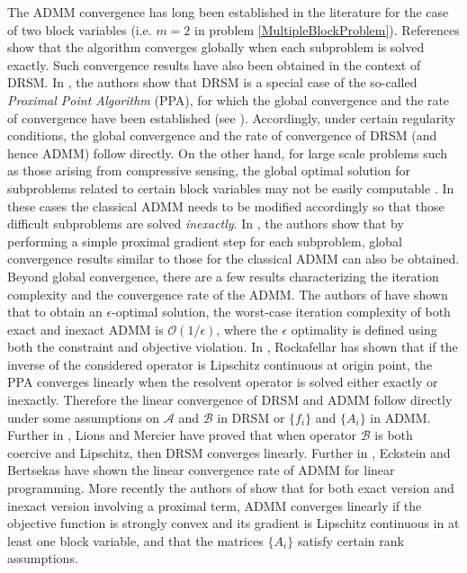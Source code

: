 \documentclass{mcom-l}
\theoremstyle{definition}
\theoremstyle{remark}
\numberwithin{equation}{section}
\begin{document}
The ADMM convergence has long been established in the literature for the case of two block variables (i.e. $m=2$ in problem \eqref{MultipleBlockProblem}). References \cite{GabayMercier1976,Glowinski1975} show that the algorithm converges globally when each subproblem is solved exactly. Such convergence results have also been obtained in the context of DRSM. In \cite{EcksteinBertsekas1992}, the authors show that DRSM is a special case of the so-called {\em{Proximal Point Algorithm}} (PPA), for which the global convergence and the rate of convergence have been established (see \cite{Rockafellar1976}). Accordingly, under certain regularity conditions, the global convergence and the rate of convergence of DRSM (and hence ADMM) follow directly. On the other hand, for large scale problems such as those arising from compressive sensing, the global optimal solution for subproblems related to certain block variables may not be easily computable \cite{YangZhang2011}.  In these cases the classical ADMM needs to be modified accordingly so that those difficult subproblems are solved {\it inexactly}. In \cite{Eckstein1994,EcksteinBertsekas1992,HeLiaoHanYang2002,WangYuan2012,YangZhang2011,ZhangBurgerOsher2011}, the authors show that by performing a simple proximal gradient step for each subproblem, global convergence results similar to those for the classical ADMM can also be obtained. Beyond global convergence, there are a few results characterizing the iteration complexity and the convergence rate of the ADMM. The authors of \cite{HeYuan2012} have shown that to obtain an $\epsilon$-optimal solution, the worst-case iteration complexity of both exact and inexact ADMM is $\mathcal{O}(1/\epsilon)$, where the $\epsilon$ optimality is defined using both the constraint and objective violation. In \cite{Rockafellar1976}, Rockafellar has shown that if the inverse of the considered operator is Lipschitz continuous at origin point, the PPA converges linearly when the resolvent operator is solved either exactly or inexactly. Therefore the linear convergence of DRSM and ADMM follow directly under some assumptions on $\mathcal{A}$ and $\mathcal{B}$ in DRSM or $\{f_i\}$ and $\{A_i\}$ in ADMM. Further in \cite{LionsMercier1979}, Lions and Mercier have proved that when operator $\mathcal{B}$ is both coercive and Lipschitz, then DRSM converges linearly. Further in \cite{EcksteinBertsekas1990}, Eckstein and Bertsekas have shown the linear convergence rate of ADMM for linear programming. More recently the authors of \cite{DengYin2012} show that for both exact version and inexact version involving a proximal term, ADMM converges linearly if the objective function is strongly convex and its gradient is Lipschitz continuous in at least one block variable, and that the matrices $\{A_i\}$ satisfy certain rank assumptions.
\end{document}
